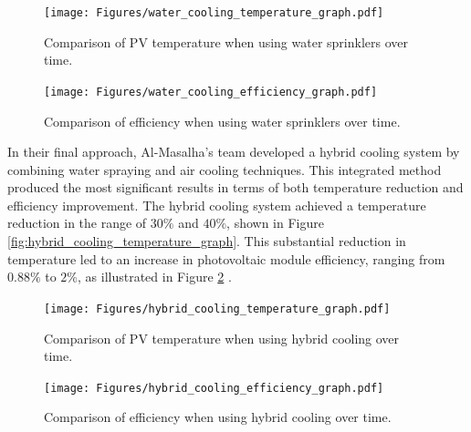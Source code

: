 \begin{figure}[ht]
    \centering
    \begin{minipage}[b]{0.45\linewidth}
        \centering
        \texttt{[image: Figures/water\_cooling\_temperature\_graph.pdf]}
        \caption{Comparison of PV temperature when using water sprinklers over time. \cite{Al-Masalha2024ImprovingSystems}}
        \label{fig:water_cooling_temperature_graph}
    \end{minipage}
    \hfill
    \begin{minipage}[b]{0.45\linewidth}
        \centering
        \texttt{[image: Figures/water\_cooling\_efficiency\_graph.pdf]}
        \caption{Comparison of efficiency when using water sprinklers over time. \cite{Al-Masalha2024ImprovingSystems}}
        \label{fig:water_cooling_efficiency_graph}
    \end{minipage}
\end{figure}

In their final approach, Al-Masalha's team developed a hybrid cooling system by combining water spraying and air cooling techniques. This integrated method produced the most significant results in terms of both temperature reduction and efficiency improvement. The hybrid cooling system achieved a temperature reduction in the range of $30\%$ and $40\%$, shown in Figure \ref{fig:hybrid_cooling_temperature_graph}. This substantial reduction in temperature led to an increase in photovoltaic module efficiency, ranging from $0.88\%$ to $2\%$, as illustrated in Figure \ref{fig:hybrid_cooling_efficiency_graph} \cite{Al-Masalha2024ImprovingSystems}.

\begin{figure}[H]
    \centering
    \begin{minipage}[b]{0.45\linewidth}
        \centering
        \texttt{[image: Figures/hybrid\_cooling\_temperature\_graph.pdf]}
        \caption{Comparison of PV temperature when using hybrid cooling over time. \cite{Al-Masalha2024ImprovingSystems}}
        \label{fig:hybrid_cooling_temperature_graph}
    \end{minipage}
    \hfill
    \begin{minipage}[b]{0.45\linewidth}
        \centering
        \texttt{[image: Figures/hybrid\_cooling\_efficiency\_graph.pdf]}
        \caption{Comparison of efficiency when using hybrid cooling over time. \cite{Al-Masalha2024ImprovingSystems}}
        \label{fig:hybrid_cooling_efficiency_graph}
    \end{minipage}
\end{figure}

